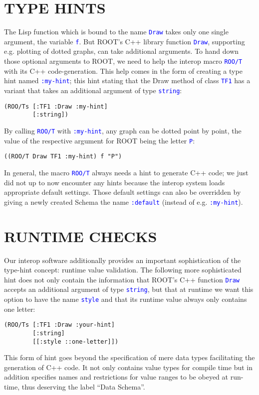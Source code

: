 \documentclass[twocolumn]{article}
\begin{document}
\section{TYPE HINTS}
The Lisp function which is bound to the name \texttt{\textcolor{blue}{Draw}} takes only one single argument, the variable \texttt{\textcolor{blue}{f}}. But ROOT’s C++ library function \texttt{\textcolor{blue}{Draw}}, supporting e.g. plotting of dotted graphs, can take additional arguments. To hand down those optional arguments to ROOT, we need to help the interop macro \texttt{\textcolor{blue}{ROO/T}} with its C++ code-generation. This help comes in the form of creating a type hint named \texttt{\textcolor{blue}{:my-hint}}; this hint stating that the Draw method of class \texttt{\textcolor{blue}{TF1}} has a variant that takes an additional argument of type \texttt{\textcolor{blue}{string}}:
{\color{blue}\begin{verbatim}
(ROO/Ts [:TF1 :Draw :my-hint]
        [:string])
\end{verbatim}}
By calling \texttt{\textcolor{blue}{ROO/T}} with \texttt{\textcolor{blue}{:my-hint}}, any graph can be dotted point by point, the value of the respective argument for ROOT being the letter \texttt{\textcolor{blue}{P}}:
{\color{blue}\begin{verbatim}
((ROO/T Draw TF1 :my-hint) f "P")
\end{verbatim}}
In general, the macro \texttt{\textcolor{blue}{ROO/T}} always needs a hint to generate C++ code; we just did not up to now encounter any hints because the interop system loads appropriate default settings. Those default settings can also be overridden by giving a newly created Schema the name \texttt{\textcolor{blue}{:default}} (instead of e.g. \texttt{\textcolor{blue}{:my-hint}}).

\section{RUNTIME CHECKS}
Our interop software additionally provides an important sophistication of the type-hint concept: runtime value validation. The following more sophisticated hint does not only contain the information that ROOT’s C++ function \texttt{\textcolor{blue}{Draw}} accepts an additional argument of type \texttt{\textcolor{blue}{string}}, but that at runtime we want this option to have the name \texttt{\textcolor{blue}{style}} and that its runtime value always only contains one letter:
{\color{blue}\begin{verbatim}
(ROO/Ts [:TF1 :Draw :your-hint]
        [:string]
        [[:style ::one-letter]])
\end{verbatim}}
This form of hint goes beyond the specification of mere data types facilitating the generation of C++ code. It not only contains value types for compile time but in addition specifies names and restrictions for value ranges to be obeyed at run-time, thus deserving the label “Data Schema”.
\end{document}

